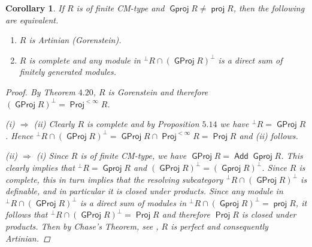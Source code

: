 \documentclass[oneside, a4paper,reqno]{amsart}
\numberwithin{equation}{section}
\newtheorem{cor}[thm]{Corollary}
\theoremstyle{definition}
\begin{document}
\begin{cor} If $R$ is of finite CM-type
and ${\operatorname{\mathsf{Gproj}}\nolimits} R \neq \operatorname*{\mathsf{proj}} R$, then the following are equivalent.
\begin{enumerate}
\item $R$ is Artinian (Gorenstein).
\item $R$ is complete and any module in ${^{\pmb{\bot}}}R \cap ({\operatorname{\mathsf{GProj}}\nolimits} R)^{\bot}$ is a
direct sum of finitely generated modules.
\end{enumerate}
\begin{proof} By Theorem $4.20$,  $R$ is Gorenstein and therefore $({\operatorname{\mathsf{GProj}}\nolimits} R)^{\bot} = \operatorname*{\mathsf{Proj}}^{<\infty}R$.

(i) $\Rightarrow$ (ii)  Clearly $R$ is complete and by Proposition $5.14$ we have ${^{\pmb{\bot}}}R  = {\operatorname{\mathsf{GProj}}\nolimits} R$. Hence ${^{\pmb{\bot}}}R \cap ({\operatorname{\mathsf{GProj}}\nolimits} R)^{\bot} = {\operatorname{\mathsf{GProj}}\nolimits} R \cap \operatorname*{\mathsf{Proj}}^{<\infty}R = \operatorname*{\mathsf{Proj}} R$ and (ii) follows.

(ii) $\Rightarrow$ (i) Since $R$ is of finite CM-type, we have ${\operatorname{\mathsf{GProj}}\nolimits} R = \operatorname*{\mathsf{Add}}{\operatorname{\mathsf{Gproj}}\nolimits} R$. This clearly implies that ${^{\bot}}R =
{\operatorname{\mathsf{Gproj}}\nolimits} R$  and $({\operatorname{\mathsf{GProj}}\nolimits} R)^{\bot} = ({\operatorname{\mathsf{Gproj}}\nolimits} R)^{\pmb{\bot}}$. Since
$R$ is complete, this in turn implies that the resolving subcategory
${^{\pmb{\bot}}}R \cap ({\operatorname{\mathsf{GProj}}\nolimits} R)^{\bot}$ is definable, and in
particular it is closed under products. Since any
module in ${^{\pmb{\bot}}}R \cap ({\operatorname{\mathsf{GProj}}\nolimits} R)^{\bot}$ is a direct sum
of modules in ${^{\bot}}R \cap ({\operatorname{\mathsf{Gproj}}\nolimits} R)^{\bot} = \operatorname*{\mathsf{proj}} R$, it follows that
${^{\pmb{\bot}}}R \cap ({\operatorname{\mathsf{GProj}}\nolimits} R)^{\bot} = \operatorname*{\mathsf{Proj}} R$ and therefore
$\operatorname*{\mathsf{Proj}} R$ is closed under products. Then by Chase's Theorem, see
\cite{JL}, $R$ is perfect and consequently Artinian.
\end{proof}
\end{cor}
\end{document}
